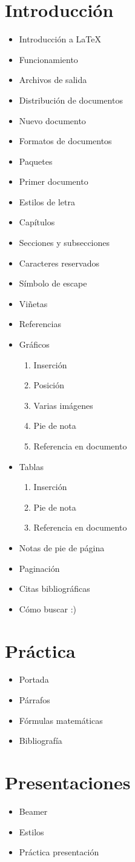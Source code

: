\documentclass[11pt,a4paper,pagesize,tablecaptionabove,abstracton,pointlessnumbers]{article}
\begin{document}
\section{Introducción}
\begin{itemize}
	\item Introducción a \LaTeX
	\item Funcionamiento
	\item Archivos de salida
	\item Distribución de documentos
	\item Nuevo documento
	\item Formatos de documentos
	\item Paquetes
	\item Primer documento
	\item Estilos de letra
	\item Capítulos
	\item Secciones y subsecciones
	\item Caracteres reservados
	\item Símbolo de escape
	\item Viñetas
	\item Referencias 
	\item Gráficos
		\begin{enumerate}[i]
			\item Inserción
			\item Posición
			\item Varias imágenes
			\item Pie de nota
			\item Referencia en documento
		\end{enumerate}			
	\item Tablas
		\begin{enumerate}[i]
			\item Inserción
			\item Pie de nota
			\item Referencia en documento
		\end{enumerate}
	\item Notas de pie de página
	\item Paginación
	\item Citas bibliográficas
	\item Cómo buscar :)
\end{itemize}


\section{Práctica}
\begin{itemize}
	\item Portada
	\item Párrafos
	\item Fórmulas matemáticas
	\item Bibliografía
\end{itemize}


\section{Presentaciones}
\begin{itemize}
	\item Beamer
	\item Estilos
	\item Práctica presentación
\end{itemize}
\end{document}
